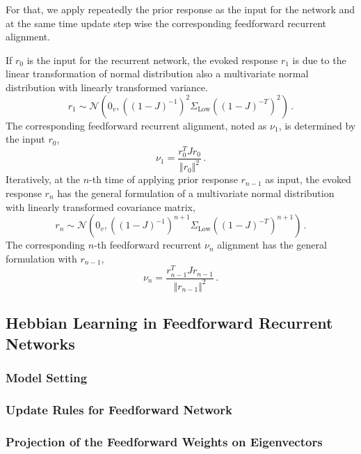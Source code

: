 \documentclass[11pt]{article}
\begin{document}
	For that, we apply repeatedly the prior response as the input for the network and at the same time update step wise the corresponding feedforward recurrent alignment. 
	
	If $r_0$ is the input for the recurrent network, the evoked response $r_1$ is due to the linear transformation of normal distribution also a multivariate normal distribution with linearly transformed variance.
		\begin{equation}
			r_1 \sim \mathcal{N}\left(0_v, \left((1-J)^{-1}\right)^2 \Sigma_{\text{Low}} \left((1-J)^{-T}\right)^2\right) \, .
		\end{equation}
	The corresponding feedforward recurrent alignment, noted as $\nu_1$, is determined by the input $r_0$,
		\begin{equation}
			\nu_1 = \frac{r_0^T J r_0}{\Vert r_0 \Vert^2}\, .
		\end{equation}
	Iteratively, at the $n$-th time of applying prior response $r_{n-1}$ as input, the evoked response $r_n$ has the general formulation of a multivariate normal distribution with linearly transformed covariance matrix,
		\begin{equation}
			r_n \sim \mathcal{N}\left( 0_v, \left((1-J)^{-1}\right)^{n+1} \Sigma_{\text{Low}} \left((1-J)^{-T}\right)^{n+1} \right) \,. 
		\end{equation}
	The corresponding $n$-th feedforward recurrent $\nu_n$ alignment has the general formulation with $r_{n-1}$,
		\begin{equation}
			\nu_n = \frac{r_{n-1}^T J r_{n-1}}{\Vert r_{n-1} \Vert^2} \,.
		\end{equation}
	
	
	\clearpage
	\subsection{Hebbian Learning in Feedforward Recurrent Networks}
	\subsubsection{Model Setting}
	\subsubsection{Update Rules for Feedforward Network}
	\subsubsection{Projection of the Feedforward Weights on Eigenvectors}
	
	
\end{document}
